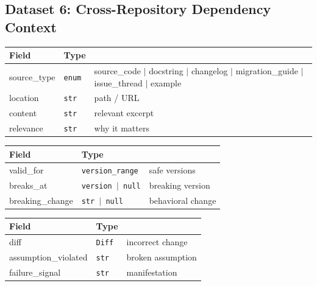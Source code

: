 \documentclass[a4paper,12pt]{article}
\begin{document}
\subsection{Dataset 6: Cross-Repository Dependency Context}

\begin{tcolorbox}[title=RequiredContext]
\footnotesize
\begin{tabularx}{\linewidth}{@{} l l Y @{}}
\toprule
\textbf{Field} & \textbf{Type} & \\
\midrule
source\_type & \texttt{enum} & source\_code $\mid$ docstring $\mid$ changelog $\mid$ migration\_guide $\mid$ issue\_thread $\mid$ example \\
location & \texttt{str} & path / URL \\
content & \texttt{str} & relevant excerpt \\
relevance & \texttt{str} & why it matters \\
\bottomrule
\end{tabularx}
\end{tcolorbox}

\begin{tcolorbox}[title=VersionSensitivity]
\footnotesize
\begin{tabularx}{\linewidth}{@{} l l Y @{}}
\toprule
\textbf{Field} & \textbf{Type} & \\
\midrule
valid\_for & \texttt{version\_range} & safe versions \\
breaks\_at & \texttt{version $\mid$ null} & breaking version \\
breaking\_change & \texttt{str $\mid$ null} & behavioral change \\
\bottomrule
\end{tabularx}
\end{tcolorbox}

\begin{tcolorbox}[title=MisuseExample]
\footnotesize
\begin{tabularx}{\linewidth}{@{} l l Y @{}}
\toprule
\textbf{Field} & \textbf{Type} & \\
\midrule
diff & \texttt{Diff} & incorrect change \\
assumption\_violated & \texttt{str} & broken assumption \\
failure\_signal & \texttt{str} & manifestation \\
\bottomrule
\end{tabularx}
\end{tcolorbox}

\end{document}
